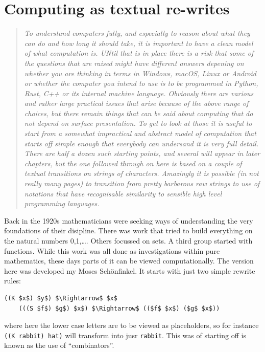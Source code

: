 \section{Computing as textual re-writes}
\begin{quotation}\textit{
To understand computers fully, and especially to reason about what they
can do and how long it should take, it is important to have a clean model
of what computation is. UNtil that is in place there is a risk that some
of the questions that are raised might have different answers depening on
whether you are thinking in terms in Windows, macOS, Linux or Android or
whether the computer you intend to use is to be programmed in Python, Rust,
C++ or its internal machine language. Obviously there are various and rather
large practical issues that arise because of the above range of choices, but
there remain things that can be said about computing that do not depend
on surface presentation. To get to look at those it is useful to start from
a somewhat impractical and abstract model of computation that starts off
simple enough that everybody can undersand it is very full detail. There are
half a dozen such starting points, and several will appear in later chapters,
but the one followed through on here is based on a couple of textual
transitions on strings of characters. Amazingly it is possible (in not
really many pages) to transition from pretty barbarous raw strings to
use of notations that have recognisable similarity to sensible high
level programming languages.
}\end{quotation}
Back in the 1920s mathematicians were seeking ways of understanding the
very foundations of their disipline. There was work that tried to build
everything on the natural numbers 0,1,\ldots. Others focussed on sets.
A third group started with functions. While this work was all done as
investigations within pure mathematics, these days parts of it can be
viewed computationally. The version here was developed my Moses
Sch\"onfinkel\cite{schonfinkel}.
It starts with just two simple rewrite rules:
\begin{lstlisting}[mathescape=true]
    ((K $x$) $y$) $\Rightarrow$ $x$
    (((S $f$) $g$) $x$) $\Rightarrow$ (($f$ $x$) ($g$ $x$))
\end{lstlisting}
where here the lower case letters are to be viewed as placeholders, so
for instance \verb+((K rabbit) hat)+ will transform into jusr \verb+rabbit+.
This was of starting off is known as the use of ``combinators''.

